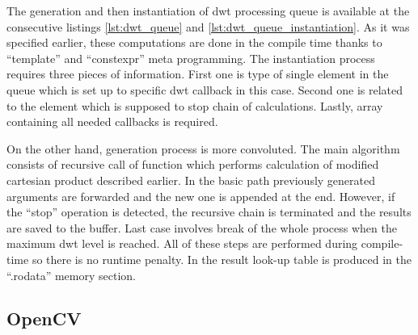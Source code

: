 The generation and then instantiation of dwt processing queue is available at the consecutive listings
\ref{lst:dwt_queue} and \ref{lst:dwt_queue_instantiation}. As it was specified earlier, these
computations are done in the compile time thanks to ``template'' and ``constexpr'' meta programming.
The instantiation process requires three pieces of information. First one is type of single
element in the queue which is set up to specific dwt callback in this case. Second one is related
to the element which is supposed to stop chain of calculations. Lastly, array containing all
needed callbacks is required.

On the other hand, generation process is more convoluted. The main algorithm consists of recursive
call of function which performs calculation of modified cartesian product described earlier.
In the basic path previously generated arguments are forwarded and the new one is appended
at the end. However, if the ``stop'' operation is detected, the recursive chain is terminated
and the results are saved to the buffer. Last case involves break of the whole process when
the maximum dwt level is reached. All of these steps are performed during compile-time so
there is no runtime penalty. In the result look-up table is produced in the ``.rodata''
memory section.

\subsection{OpenCV}

